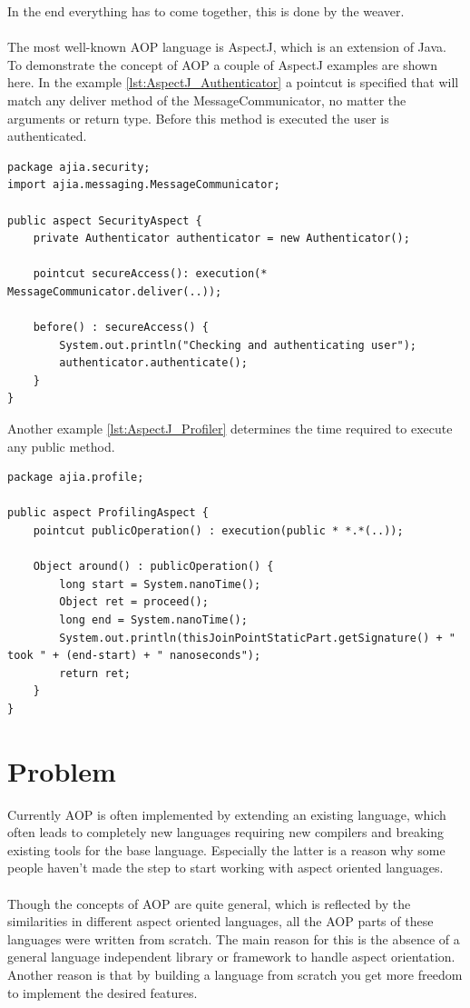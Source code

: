 \documentclass[a4paper]{report}
\begin{document}
In the end everything has to come together, this is done by the weaver.\\
\\
The most well-known AOP language is AspectJ, which is an extension of Java. To demonstrate the concept of AOP a couple of AspectJ examples are shown here. In the example \ref{lst:AspectJ_Authenticator} a pointcut is specified that will match any deliver method of the MessageCommunicator, no matter the arguments or return type. Before this method is executed the user is authenticated.
\begin{lstlisting}[caption=An aspect to authenticate the user.,label=lst:AspectJ_Authenticator]
package ajia.security;
import ajia.messaging.MessageCommunicator;

public aspect SecurityAspect {
	private Authenticator authenticator = new Authenticator();

	pointcut secureAccess(): execution(* MessageCommunicator.deliver(..));
	
	before() : secureAccess() {
		System.out.println("Checking and authenticating user");
		authenticator.authenticate();
	}
}
\end{lstlisting}
Another example \ref{lst:AspectJ_Profiler} determines the time required to execute any public method.
\begin{lstlisting}[caption=An aspect to profile methods.,label=lst:AspectJ_Profiler]
package ajia.profile;

public aspect ProfilingAspect {
	pointcut publicOperation() : execution(public * *.*(..));

	Object around() : publicOperation() {
		long start = System.nanoTime();
		Object ret = proceed();
		long end = System.nanoTime();
		System.out.println(thisJoinPointStaticPart.getSignature() + " took " + (end-start) + " nanoseconds");
		return ret;
	}
}
\end{lstlisting}

\section{Problem}
Currently AOP is often implemented by extending an existing language, which often leads to completely new languages requiring new compilers and  breaking existing tools for the base language. Especially the latter is a reason why some people haven't made the step to start working with aspect oriented languages.\\
\\
Though the concepts of AOP are quite general, which is reflected by the similarities in different aspect oriented languages, all the AOP parts of these languages were written from scratch. The main reason for this is the absence of a general language independent library or framework to handle aspect orientation. Another reason is that by building a language from scratch you get more freedom to implement the desired features.
\end{document}
